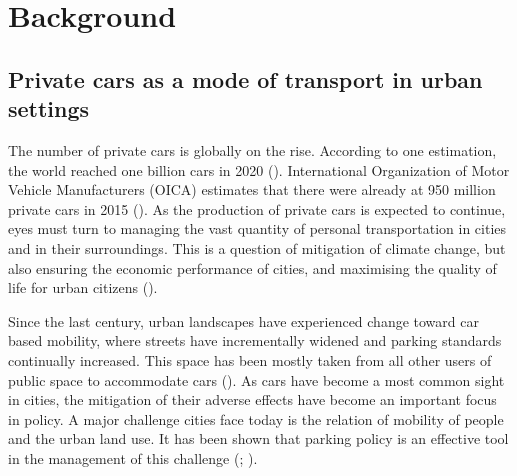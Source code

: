 \section{Background}
\label{sec:c2-background} %
\subsection{Private cars as a mode of transport in urban settings}
\justify


The number of private cars is globally on the rise. According to one estimation, the world reached one billion cars in 2020 (\cite{Sperling2009}). International Organization of Motor Vehicle Manufacturers (OICA) estimates that there were already at 950 million private cars in 2015 (\cite{OICA2020}). As the production of private cars is expected to continue, eyes must turn to managing the vast quantity of personal transportation in cities and in their surroundings. This is a question of mitigation of climate change, but also ensuring the economic performance of cities, and maximising the quality of life for urban citizens (\cite{Bertolini2003}).

Since the last century, urban landscapes have experienced change toward car based mobility, where streets have incrementally widened and parking standards continually increased. This space has been mostly taken from all other users of public space to accommodate cars (\cite{Cervero2017}). As cars have become a most common sight in cities, the mitigation of their adverse effects have become an important focus in policy. A major challenge cities face today is the relation of mobility of people and the urban land use. It has been shown that parking policy is an effective tool in the management of this challenge (\cite{Diallo2015}; \cite{Marsden2006}).

